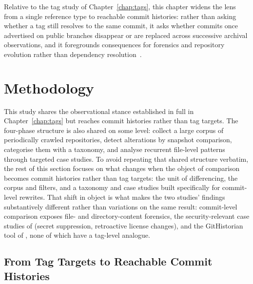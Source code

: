 Relative to the tag study of Chapter~\ref{chap:tags}, this chapter widens the lens from a single reference type to reachable commit histories: rather than asking whether a tag still resolves to the same commit, it asks whether commits once advertised on public branches disappear or are replaced across successive archival observations, and it foregrounds consequences for forensics and repository evolution rather than dependency resolution~\cite{rapaport2026tagalterations}.

\section{Methodology}
\label{sec:hist-methodology}

This study shares the observational stance established in full in Chapter~\ref{chap:tags} but reaches commit histories rather than tag targets.
The four-phase structure is also shared on some level: collect a large corpus of periodically crawled repositories, detect alterations by snapshot comparison, categorise them with a taxonomy, and analyse recurrent file-level patterns through targeted case studies.
To avoid repeating that shared structure verbatim, the rest of this section focuses on what changes when the object of comparison becomes commit histories rather than tag targets: the unit of differencing, the corpus and filters, and a taxonomy and case studies built specifically for commit-level rewrites.
That shift in object is what makes the two studies' findings substantively different rather than variations on the same result: commit-level comparison exposes file- and directory-content forensics, the security-relevant case studies of  (secret suppression, retroactive license changes), and the GitHistorian tool of , none of which have a tag-level analogue.

\subsection{From Tag Targets to Reachable Commit Histories}
\label{subsec:hist-differences}

